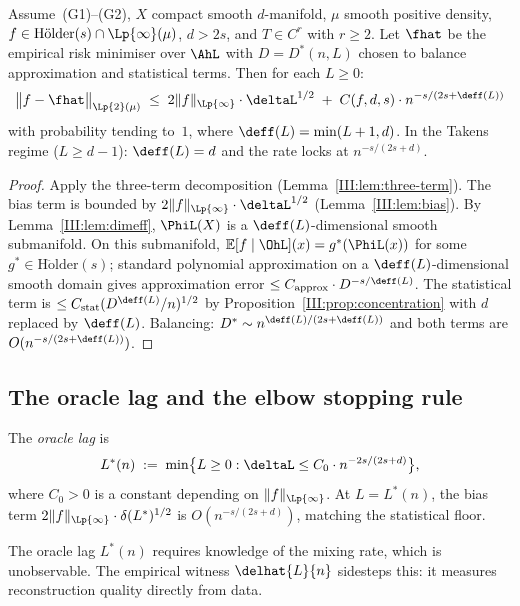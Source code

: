 \begin{proposition}
\label{III:prop:piecewise-rate}
Assume~(G1)--(G2), $X$ compact smooth $d$-manifold, $\mu$ smooth positive
density, $f \in \mathrm{H\ddot{o}lder}(s) \cap \Lp{\infty}(\mu)$, $d > 2s$,
and $T \in C^r$ with $r \geq 2$.
Let $\fhat$ be the empirical risk minimiser over $\AhL$ with $D = D^*(n,L)$
chosen to balance approximation and statistical terms.
Then for each $L \geq 0$:
\[
  \bigl\|f - \fhat\bigr\|_{\Lp{2}(\mu)}
  \;\leq\;
  2\|f\|_{\Lp{\infty}} \cdot \deltaL^{1/2}
  \;+\;
  C(f,d,s) \cdot n^{-s/(2s+\deff(L))}
\]
with probability tending to~$1$, where $\deff(L) = \min(L+1,d)$.
In the Takens regime ($L \geq d-1$): $\deff(L) = d$ and the rate locks at
$n^{-s/(2s+d)}$.
\end{proposition}

\begin{proof}
Apply the three-term decomposition (Lemma~\ref{III:lem:three-term}).
The bias term is bounded by $2\|f\|_{\Lp{\infty}} \cdot \deltaL^{1/2}$
(Lemma~\ref{III:lem:bias}).
By Lemma~\ref{III:lem:dimeff}, $\PhiL(X)$ is a $\deff(L)$-dimensional smooth
submanifold.
On this submanifold, $\mathbb{E}[f \mid \OhL](x) = g^*(\PhiL(x))$ for some
$g^* \in \mathrm{H\ddot{o}lder}(s)$; standard polynomial approximation on a
$\deff(L)$-dimensional smooth domain gives approximation error
$\leq C_{\mathrm{approx}} \cdot D^{-s/\deff(L)}$.
The statistical term is $\leq C_{\mathrm{stat}}(D^{\deff(L)}/n)^{1/2}$ by
Proposition~\ref{III:prop:concentration} with $d$ replaced by $\deff(L)$.
Balancing: $D^* \sim n^{\deff(L)/(2s+\deff(L))}$ and both terms are
$O(n^{-s/(2s+\deff(L))})$.
\end{proof}

\subsection{The oracle lag and the elbow stopping rule}

\begin{definition}
\label{III:def:oracle-lag}
The \emph{oracle lag} is
\[
  L^*(n) \;:=\; \min\bigl\{L \geq 0 : \deltaL \leq C_0 \cdot n^{-2s/(2s+d)}\bigr\},
\]
where $C_0 > 0$ is a constant depending on $\|f\|_{\Lp{\infty}}$.
At $L = L^*(n)$, the bias term $2\|f\|_{\Lp{\infty}} \cdot \delta(L^*)^{1/2}$
is $O(n^{-s/(2s+d)})$, matching the statistical floor.
\end{definition}

The oracle lag $L^*(n)$ requires knowledge of the mixing rate, which is
unobservable.
The empirical witness $\delhat{L}{n}$ sidesteps this: it measures reconstruction
quality directly from data.

